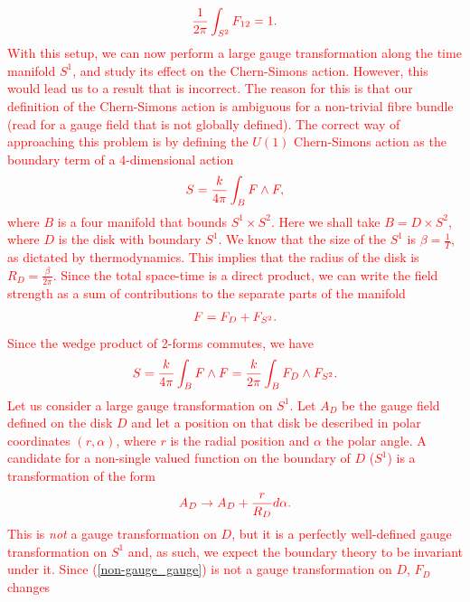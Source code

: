 \begin{align}
    \textcolor{red}{\frac{1}{2\pi} \int_{S^2} F_{12} = 1.} \label{monopole_flux}
\end{align}
    \textcolor{red}{With this setup, we can now perform a large gauge transformation along the time manifold $S^1$, and study its effect on the Chern-Simons action. However, this would lead us to a result that is incorrect. The reason for this is that our definition of the Chern-Simons action is ambiguous for a non-trivial fibre bundle (read for a gauge field that is not globally defined). The correct way of approaching this problem is by defining the $U(1)$ Chern-Simons action as the boundary term of a 4-dimensional action \cite{Dijkgraaf:1989pz}}
\begin{align}
    \textcolor{red}{S=\frac{k}{4 \pi} \int_{B} F\wedge F,}
\end{align}
 \textcolor{red}{where $B$ is a four manifold that bounds $S^1 \times S^2$. Here we shall take $B= D\times S^2$, where $D$ is the disk with boundary $S^1$. We know that the size of the $S^1$ is $\beta= \frac{1}{T}$, as dictated by thermodynamics. This implies that the radius of the disk is $R_D=\frac{\beta}{2\pi}$. Since the total space-time is a direct product, we can write the field strength as a sum of contributions to the separate parts of the manifold} 
\begin{align}
    \textcolor{red}{F= F_D +F_{S^2}.}
\end{align}
 \textcolor{red}{Since the wedge product of 2-forms commutes, we have }
\begin{align}
    \textcolor{red}{   S = \frac{k}{4\pi}\int_B F\wedge F = \frac{k}{2\pi} \int_B F_{D} \wedge F_{S^2}.}
\end{align}
\textcolor{red}{Let \textcolor{red}{us} consider a large gauge transformation on $S^1$. Let $A_D$ be the gauge field defined on the disk $D$ and let a position on that disk be described in polar coordinates $(r, \alpha)$, where $r$ is the radial position and $\alpha$ the polar angle. A candidate for a non-single valued function on the boundary of $D$ ($S^1$) is a transformation of the form }
\begin{align}
    \textcolor{red}{A_D \rightarrow A_D + \frac{r}{R_D} d\alpha. \label{non-gauge_gauge}}
\end{align}
\textcolor{red}{This is \textit{not} a gauge transformation on $D$, but it is a perfectly well-defined gauge transformation on $S^1$ and, as such, we expect the boundary theory to be invariant under it. Since (\ref{non-gauge_gauge}) is not a gauge transformation on $D$, $F_D$ changes}
